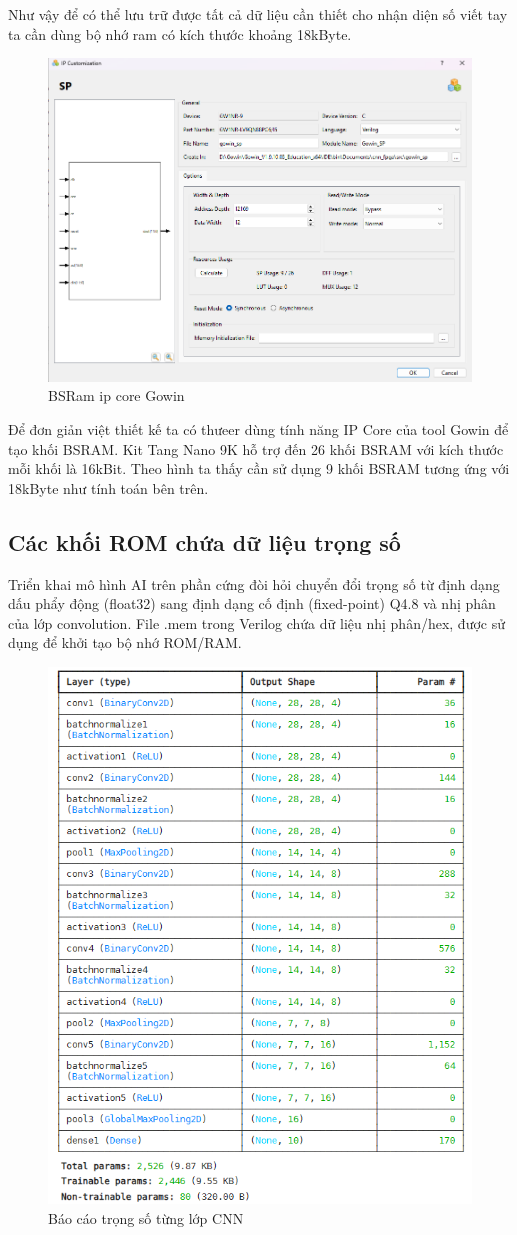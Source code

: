 Như vậy để có thể lưu trữ được tất cả dữ liệu cần thiết cho nhận diện số viết tay ta cần dùng bộ nhớ ram có kích thước khoảng 18kByte.
\begin{figure}[H]
    \centering
    \includegraphics[width=0.75\linewidth]{Images/ipcoreram.png}
    \caption{BSRam ip core Gowin}
    \label{fig:enter-label}
\end{figure}
Để đơn giản việt thiết kế ta có thưeer dùng tính năng IP Core của tool Gowin để tạo khối BSRAM. Kit Tang Nano 9K hỗ trợ đến 26 khối BSRAM với kích thước mỗi khối là 16kBit. Theo hình ta thấy cần sử dụng 9 khối BSRAM tương ứng với 18kByte như tính toán bên trên.

\subsection{Các khối ROM chứa dữ liệu trọng số}
Triển khai mô hình AI trên phần cứng đòi hỏi chuyển đổi trọng số từ định dạng dấu phẩy động (float32) sang định dạng cố định (fixed-point) Q4.8 và nhị phân của lớp convolution. File .mem trong Verilog chứa dữ liệu nhị phân/hex, được sử dụng để khởi tạo bộ nhớ ROM/RAM.

\begin{figure}[H]
    \centering
    \includegraphics[width=0.75\linewidth]{Images/cnnmodel.png}
    \caption{Báo cáo trọng số từng lớp CNN}
    \label{fig:enter-label}
\end{figure}

